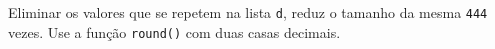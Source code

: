 \documentclass[12pt,varwidth=16cm,border=1pt]{standalone}
\begin{document}
Eliminar os valores que se repetem na lista \verb+d+, reduz o tamanho da mesma \verb+444+ vezes. Use a função \verb+round()+ com duas casas decimais.

\questiomfalse
\end{document}
